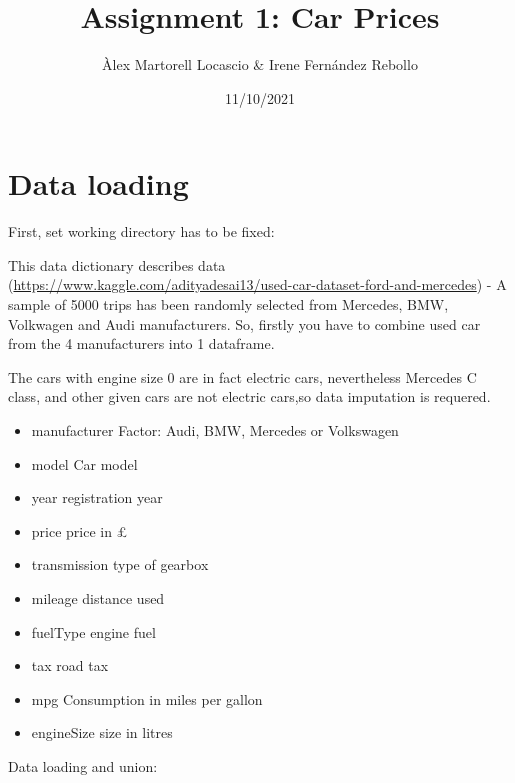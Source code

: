 \documentclass[
]{article}
\title{Assignment 1: Car Prices}
\author{Àlex Martorell Locascio \& Irene Fernández Rebollo}
\date{11/10/2021}
\providecommand{\tightlist}{%
  \setlength{\itemsep}{0pt}\setlength{\parskip}{0pt}}
\begin{document}
\maketitle

{
\setcounter{tocdepth}{2}
\tableofcontents
}
\hypertarget{data-loading}{%
\section{Data loading}\label{data-loading}}

First, set working directory has to be fixed:

This data dictionary describes data
(\url{https://www.kaggle.com/adityadesai13/used-car-dataset-ford-and-mercedes})
- A sample of 5000 trips has been randomly selected from Mercedes, BMW,
Volkwagen and Audi manufacturers. So, firstly you have to combine used
car from the 4 manufacturers into 1 dataframe.

The cars with engine size 0 are in fact electric cars, nevertheless
Mercedes C class, and other given cars are not electric cars,so data
imputation is requered.

\begin{itemize}
\tightlist
\item
  manufacturer Factor: Audi, BMW, Mercedes or Volkswagen
\item
  model Car model
\item
  year registration year
\item
  price price in £
\item
  transmission type of gearbox
\item
  mileage distance used
\item
  fuelType engine fuel
\item
  tax road tax
\item
  mpg Consumption in miles per gallon\\
\item
  engineSize size in litres
\end{itemize}

Data loading and union:
\end{document}
